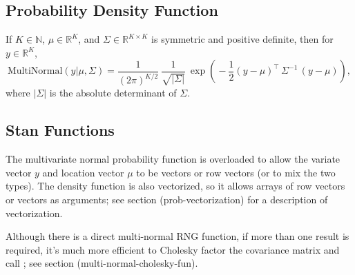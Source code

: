 \begin{description}
{\begin{description}
\subsection{Probability Density Function}


If $K \in \mathbb{N}$, $\mu \in \mathbb{R}^K$, and $\Sigma \in \mathbb{R}^{K \times   K}$ is symmetric and positive definite, then for $y \in \mathbb{R}^K$, \[ \text{MultiNormal}(y|\mu,\Sigma) = \frac{1}{\left( 2 \pi \right)^{K/2}} \ \frac{1}{\sqrt{|\Sigma|}} \ \exp \! \left( \! - \frac{1}{2} (y - \mu)^{\top} \, \Sigma^{-1} \, (y - \mu) \right) \! , \] where $|\Sigma|$ is the absolute determinant of $\Sigma$.




\subsection{Stan Functions}


The multivariate normal probability function is overloaded to allow the variate vector $y$ and location vector $\mu$ to be vectors or row vectors (or to mix the two types).  The density function is also vectorized, so it allows arrays of row vectors or vectors as arguments; see section \@ref(prob-vectorization) for a description of vectorization.


\begin{description}             \end{description}


Although there is a direct multi-normal RNG function, if more than one result is required, it's much more efficient to Cholesky factor the covariance matrix and call ;  see section \@ref(multi-normal-cholesky-fun).



\end{description}}
\end{description}
